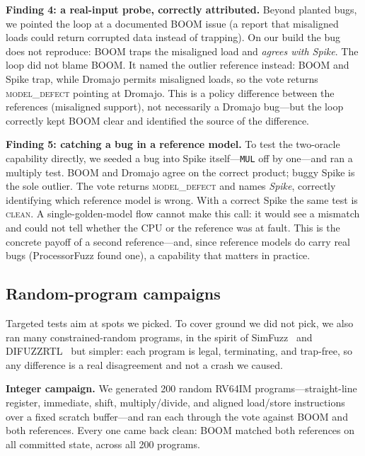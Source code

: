 \documentclass[conference]{IEEEtran}
\newcommand{\code}[1]{\texttt{\small #1}}
\newcommand{\cls}[1]{\textsc{#1}}
\begin{document}
\textbf{Finding 4: a real-input probe, correctly attributed.} Beyond planted
bugs, we pointed the loop at a documented BOOM issue (a report that misaligned
loads could return corrupted data instead of trapping). On our build the bug does
not reproduce: BOOM traps the misaligned load and \emph{agrees with Spike}. The
loop did not blame BOOM. It named the outlier reference instead: BOOM and Spike
trap, while Dromajo permits misaligned loads, so the vote returns
\cls{model\_defect} pointing at Dromajo. This is a policy difference between the
references (misaligned support), not necessarily a Dromajo bug---but the loop
correctly kept BOOM clear and identified the source of the difference.

\textbf{Finding 5: catching a bug in a reference model.} To test the two-oracle
capability directly, we seeded a bug into Spike itself---\code{MUL} off by
one---and ran a multiply test. BOOM and Dromajo agree on the correct product;
buggy Spike is the sole outlier. The vote returns \cls{model\_defect} and names
\emph{Spike}, correctly identifying which reference model is wrong. With a correct
Spike the same test is \cls{clean}. A single-golden-model flow cannot make this
call: it would see a mismatch and could not tell whether the CPU or the reference
was at fault. This is the concrete payoff of a second reference---and, since
reference models do carry real bugs (ProcessorFuzz found one), a capability that
matters in practice.

\subsection{Random-program campaigns}
Targeted tests aim at spots we picked. To cover ground we did not pick, we also
ran many constrained-random programs, in the spirit of SimFuzz~\cite{simfuzz} and
DIFUZZRTL~\cite{difuzzrtl} but simpler: each program is legal, terminating, and
trap-free, so any difference is a real disagreement and not a crash we caused.

\textbf{Integer campaign.} We generated 200 random RV64IM programs---straight-line
register, immediate, shift, multiply/divide, and aligned load/store instructions
over a fixed scratch buffer---and ran each through the vote against BOOM and both
references. Every one came back clean: BOOM matched both references on all
committed state, across all 200 programs.
\end{document}
